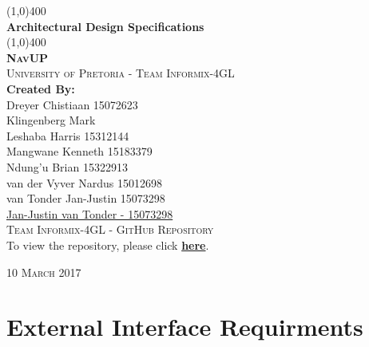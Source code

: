 \documentclass{article}
\begin{document}
	\begin{titlepage}
		\begin{center}

			\line(1,0){400}\\
			[6mm]
			\huge{
				\bfseries Architectural Design Specifications
			}\\
			[2mm]
			\line(1,0){400}\\
			[15mm]
			\textsc{\large{\textbf{NavUP}}}\\
			[4.5mm]
			\textsc{\large University of Pretoria - Team Informix-4GL}\\
			[20mm]
			\large{\textbf{Created By:}}\\
			[2mm]
			\large{
				Dreyer Chistiaan 15072623 \\
				Klingenberg Mark  \\
				Leshaba Harris 15312144 \\
				Mangwane Kenneth 15183379 \\
				Ndung'u Brian 15322913 \\
				van der Vyver Nardus 15012698 \\
				van Tonder Jan-Justin 15073298 \\
				\href{https://github.com/jan-justin}{Jan-Justin van Tonder - 15073298}
			}\\
			[30mm]
			
		\textsc{\Large Team Informix-4GL - GitHub Repository}\\[2mm]
			To view the repository, please click 
		\href{https://github.com/MarkKlingenberg/Informix-4gl}{\textbf{here}}. \\[45mm]
		\end{center}
		\begin{flushright}
			\textsc{\large 10 March 2017}
		\end{flushright}
	\end{titlepage}

	\cleardoublepage
	\thispagestyle{empty}
	\tableofcontents
	\cleardoublepage

	\thispagestyle{empty}
	\listoffigures
	\cleardoublepage
	\setcounter{page}{1}
	
	\section{External Interface Requirments}\label{sec:external-inteface-requirments}
	
	
		
	\clearpage
		
\end{document}
